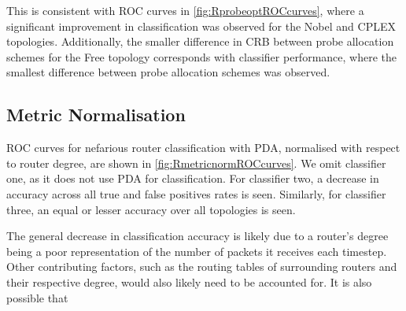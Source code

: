 This is consistent with ROC curves in \cref{fig:RprobeoptROCcurves}, where a significant improvement in classification was observed for the Nobel and CPLEX topologies. Additionally, the smaller difference in CRB between probe allocation schemes for the Free topology corresponds with classifier performance, where the smallest difference between probe allocation schemes was observed.\par


\subsection{Metric Normalisation}
\label{ssec:Rmetricnormilisation}
ROC curves for nefarious router classification with PDA, normalised with respect to router degree, are shown in \cref{fig:RmetricnormROCcurves}. We omit classifier one, as it does not use PDA for classification. For classifier two, a decrease in accuracy across all true and false positives rates is seen. Similarly, for classifier three, an equal or lesser accuracy over all topologies is seen.\par
The general decrease in classification accuracy is likely due to a router's degree being a poor representation of the number of packets it receives each timestep. Other contributing factors, such as the routing tables of surrounding routers and their respective degree, would also likely need to be accounted for. It is also possible that

